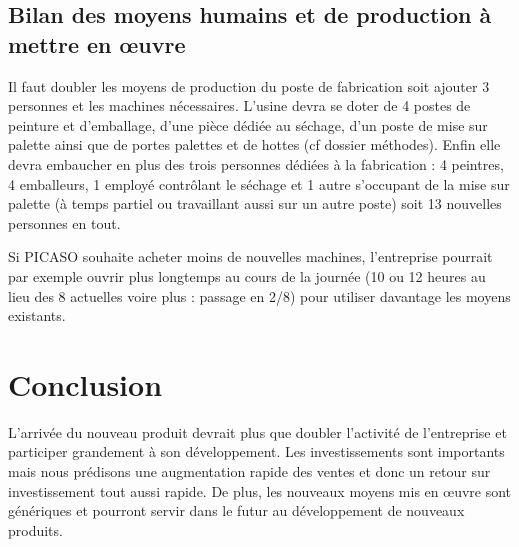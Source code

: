 \documentclass[a4paper]{../TPInsa}
\begin{document}
	\subsection{Bilan des moyens humains et de production à mettre en œuvre}

	Il faut doubler les moyens de production du poste de fabrication soit ajouter 3 personnes et les machines nécessaires. 
	L'usine devra se doter de 4 postes de peinture et d'emballage, d'une pièce dédiée au séchage, d'un poste de mise sur palette ainsi que de portes palettes et de hottes (cf dossier méthodes). 
	Enfin elle devra embaucher en plus des trois personnes dédiées à la fabrication : 4 peintres, 4 emballeurs, 1 employé contrôlant le séchage et 1 autre s'occupant de la mise sur palette (à temps partiel ou travaillant aussi sur un autre poste) soit 13 nouvelles personnes en tout. 
	
	Si PICASO souhaite acheter moins de nouvelles machines, l'entreprise pourrait par exemple ouvrir plus longtemps au cours de la journée (10 ou 12 heures au lieu des 8 actuelles voire plus : passage en 2/8) pour utiliser davantage les moyens existants. 

	\section{Conclusion}

L'arrivée du nouveau produit devrait plus que doubler l'activité de l'entreprise et participer grandement à son développement. Les investissements sont importants mais nous prédisons une augmentation rapide des ventes et donc un retour sur investissement tout aussi rapide. De plus, les nouveaux moyens mis en œuvre sont génériques et pourront servir dans le futur au développement de nouveaux produits. 




















	
\end{document}
